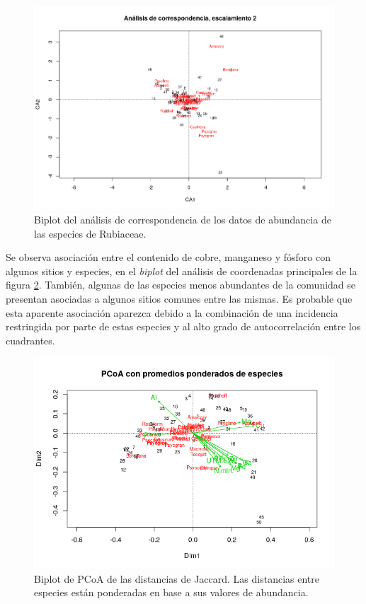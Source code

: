\documentclass[11pt,]{article}
\begin{document}
\begin{figure}
\centering
\includegraphics{biplot_correspndncia_sps_escal_2_2.png}
\caption{Biplot del análisis de correspondencia de los datos de
abundancia de las especies de Rubiaceae.
\label{fig:biplot_correspndncia_sps_escal_2_2}}
\end{figure}

Se observa asociación entre el contenido de cobre, manganeso y fósforo
con algunos sitios y especies, en el \emph{biplot} del análisis de
coordenadas principales de la figura
\ref{fig:pcoa_sps_jacc_var_ambient}. También, algunas de las especies
menos abundantes de la comunidad se presentan asociadas a algunos sitios
comunes entre las mismas. Es probable que esta aparente asociación
aparezca debido a la combinación de una incidencia restringida por parte
de estas especies y al alto grado de autocorrelación entre los
cuadrantes.

\begin{figure}
\centering
\includegraphics{pcoa_sps_jacc_var_ambient.png}
\caption{Biplot de PCoA de las distancias de Jaccard. Las distancias
entre especies están ponderadas en base a sus valores de abundancia.
\label{fig:pcoa_sps_jacc_var_ambient}}
\end{figure}
\end{document}
